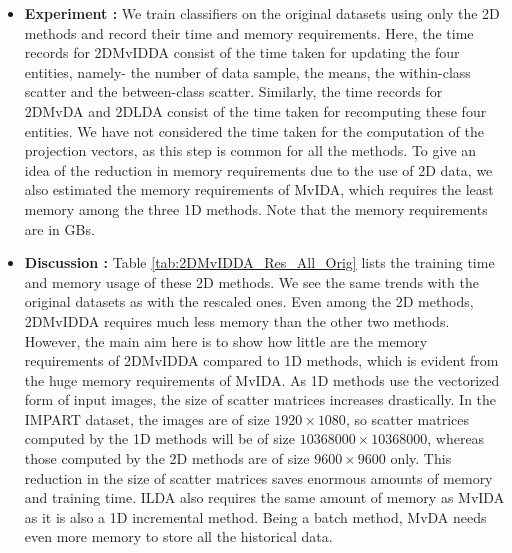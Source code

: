 \begin{itemize}
\item \textbf{Experiment :}
We train classifiers on the original datasets using only the 2D methods and record their time and memory requirements. Here, the time records for 2DMvIDDA consist of the time taken for updating the four entities, namely- the number of data sample, the means, the within-class scatter and the between-class scatter. Similarly, the time records for 2DMvDA and 2DLDA consist of the time taken for recomputing these four entities. We have not considered the time taken for the computation of the projection vectors, as this step is common for all the methods. To give an idea of the reduction in memory requirements due to the use of 2D data, we also estimated the memory requirements of MvIDA, which requires the least memory among the three 1D methods. Note that the memory requirements are in GBs.

\item \textbf{Discussion :}
Table \ref{tab:2DMvIDDA_Res_All_Orig} lists the training time and memory usage of these 2D methods. We see the same trends with the original datasets as with the rescaled ones. Even among the 2D methods, 2DMvIDDA requires much less memory than the other two methods. However, the main aim here is to show how little are the memory requirements of 2DMvIDDA compared to 1D methods, which is evident from the huge memory requirements of MvIDA. As 1D methods use the vectorized form of input images, the size of scatter matrices increases drastically. In the IMPART dataset, the images are of size $1920 \times 1080$, so scatter matrices computed by the 1D methods will be of size $10368000 \times 10368000$, whereas those computed by the 2D methods are of size $9600 \times 9600$ only. This reduction in the size of scatter matrices saves enormous amounts of memory and training time. ILDA also requires the same amount of memory as MvIDA as it is also a 1D incremental method. Being a batch method, MvDA needs even more memory to store all the historical data.
\end{itemize}














